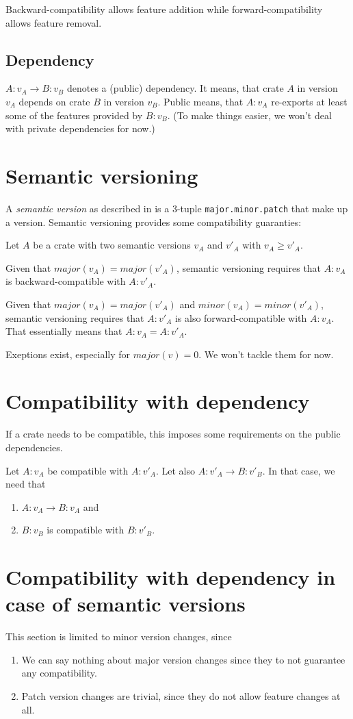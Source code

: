 \documentclass{article}
\begin{document}
    Backward-compatibility allows feature addition while forward-compatibility allows feature removal.

    \subsection{Dependency}
    $A:v_A \rightarrow B:v_B$ denotes a (public) dependency. It means, that crate $A$ in version $v_A$ depends on crate $B$ in version $v_B$. Public means, that $A:v_A$ re-exports at least some of the features provided by $B:v_B$. (To make things easier, we won't deal with private dependencies for now.)

    \section{Semantic versioning}
    A \emph{semantic version} as described in \cite{semver} is a 3-tuple \texttt{major.minor.patch} that make up a version. Semantic versioning provides some compatibility guaranties:

    Let $A$ be a crate with two semantic versions $v_A$ and $v'_A$ with $v_A \geq v'_A$.

    Given that $major(v_A) = major(v'_A)$, semantic versioning requires that $A:v_A$ is backward-compatible with $A:v'_A$.

    Given that $major(v_A) = major(v'_A)$ and $minor(v_A) = minor(v'_A)$, semantic versioning requires that $A:v'_A$ is also forward-compatible with $A:v_A$. That essentially means that $A:v_A = A:v'_A$.

    Exeptions exist, especially for $major(v) = 0$. We won't tackle them for now.

    \section{Compatibility with dependency}
    If a crate needs to be compatible, this imposes some requirements on the public dependencies.

    Let $A:v_A$ be compatible with $A:v'_A$. Let also $A:v'_A \rightarrow B:v'_B$. In that case, we need that
    \begin{enumerate}
        \item $A:v_A \rightarrow B:v_A$ and
        \item $B:v_B$ is compatible with $B:v'_B$.
    \end{enumerate}

    \section{Compatibility with dependency in case of semantic versions}
    \label{sec:Compatibility_with_dependency_in_case_of_semantic_versions}
    This section is limited to minor version changes, since
    \begin{enumerate}
        \item We can say nothing about major version changes since they to not guarantee any compatibility.
        \item Patch version changes are trivial, since they do not allow feature changes at all.
    \end{enumerate}
\end{document}
